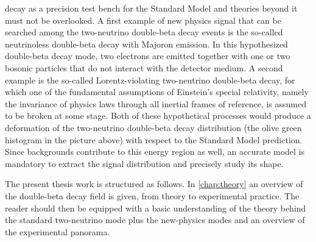 decay as a precision test bench for the Standard Model and theories beyond it must not be
overlooked. A first example of new physics signal that can be searched among the
two-neutrino double-beta decay events is the so-called neutrinoless double-beta decay with
Majoron emission. In this hypothesized double-beta decay mode, two electrons are emitted
together with one or two bosonic particles that do not interact with the detector medium.
A second example is the so-called Lorentz-violating two-neutrino double-beta decay, for
which one of the fundamental assumptions of Einstein's special relativity, namely the
invariance of physics laws through all inertial frames of reference, is assumed to be
broken at some stage. Both of these hypothetical processes would produce a deformation of
the two-neutrino double-beta decay distribution (the olive green histogram in the picture
above) with respect to the Standard Model prediction. Since backgrounds contribute to
this energy region as well, an accurate model is mandatory to extract the signal
distribution and precisely study its shape.

The present thesis work is structured as follows. In \cref{chap:theory} an overview of the
double-beta decay field is given, from theory to experimental practice. The reader should
then be equipped with a basic understanding of the theory behind the standard two-neutrino
mode plus the new-physics modes and an overview of the experimental panorama.

